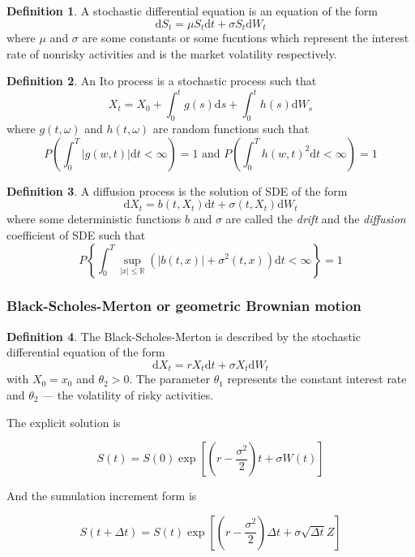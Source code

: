 \documentclass{article}
\theoremstyle{definition}
\newtheorem{definition}{Definition}[section]
\begin{document}
\begin{definition}
    A stochastic differential equation is an equation of the form
    $$\mathrm d S_t = \mu S_t \mathrm dt + \sigma S_t \mathrm d W_t$$
    where $\mu$ and $\sigma$ are some constants or some fucntions which represent the interest rate of nonrisky activities and is the market volatility respectively.
\end{definition}

\begin{definition}
    An Ito process is a stochastic process such that
    $$X_t = X_0 + \int_0^t g(s) \mathrm ds + \int_0^t h(s) \mathrm dW_s$$
    where $g(t, \omega)$ and $h(t, \omega)$ are random functions such that
    $$P \left( \int_0^T |g(w, t)| \mathrm dt  < \infty\right) = 1 \text{ and } P \left( \int_0^T h(w, t)^2 \mathrm dt  < \infty\right) = 1$$
\end{definition}

\begin{definition}
    A diffusion process is the solution of SDE of the form
    $$\mathrm d X_t = b(t, X_t) \mathrm  d t + \sigma(t, X_t) \mathrm d W_t$$
    where some deterministic functions $b$ and $\sigma$ are called the \emph{drift} and the \emph{diffusion} coefficient of SDE such that
    $$P\left\{\int_0^T \sup_{|x|\leq \mathbb R}(|b(t, x)| + \sigma^2(t, x))\mathrm dt < \infty\right\} = 1$$
\end{definition}

\subsubsection{Black-Scholes-Merton or geometric Brownian motion}

\begin{definition}
    The  Black-Scholes-Merton is described by the stochastic differential equation of the form
    $$\mathrm d X_t = r X_t \mathrm d t + \sigma X_t \mathrm d W_t$$
    with $X_0=x_0$ and $\theta_2 > 0$. The parameter $\theta_1$ represents the constant interest rate and $\theta_2$ --- the volatility of risky activities.
\end{definition}

The explicit solution is 

$$S(t) = S(0) \exp\left[ \left(r - \frac{\sigma^2}{2} \right) t + \sigma W(t) \right]$$

And the sumulation increment form is

$$S(t+\Delta t) = S(t)\exp\left[ \left( r - \frac{\sigma^2}{2} \right) \Delta t + \sigma \sqrt{\Delta t} Z \right]$$
\end{document}

